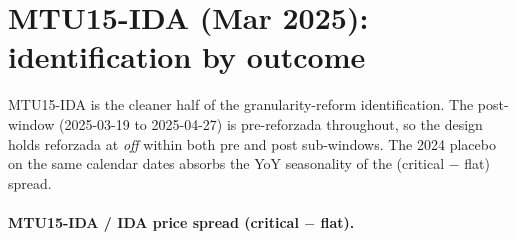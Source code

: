 \documentclass[11pt,a4paper]{article}
\begin{document}
\section{MTU15-IDA (Mar 2025): identification by outcome}\label{sec:ident:mtu15ida}

MTU15-IDA is the cleaner half of the granularity-reform identification. The post-window (2025-03-19 to 2025-04-27) is pre-reforzada throughout, so the design holds reforzada at \emph{off} within both pre and post sub-windows. The 2024 placebo on the same calendar dates absorbs the YoY seasonality of the (critical $-$ flat) spread.

\paragraph{MTU15-IDA / IDA price spread (critical $-$ flat).}
\end{document}
